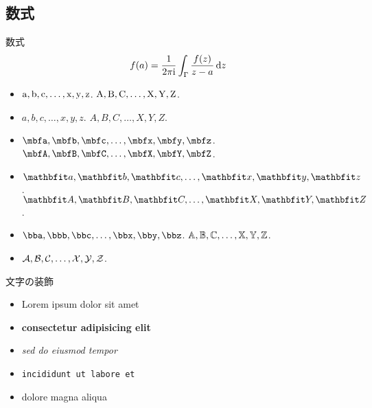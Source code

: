 \documentclass[unicode]{beamer}
\begin{document}
  \subsection{数式}
  \begin{frame}{数式}
    \begin{align}
      f(a) = \frac{1}{2\pi\mathrm{i}} \int_\Gamma \frac{f(z)}{z-a} \dd{z}
    \end{align}
    \begin{itemize}
      \item $\mathrm{a},\mathrm{b},\mathrm{c},\dots,\mathrm{x},\mathrm{y},\mathrm{z}$. $\mathrm{A},\mathrm{B},\mathrm{C},\dots,\mathrm{X},\mathrm{Y},\mathrm{Z}$.
      \item $a,b,c,\dots,x,y,z$. $A,B,C,\dots,X,Y,Z$.
      \item $\bfa,\bfb,\bfc,\dots,\bfx,\bfy,\bfz$. $\bfA,\bfB,\bfC,\dots,\bfX,\bfY,\bfZ$.
      \item $\bma,\bmb,\bmc,\dots,\bmx,\bmy,\bmz$. $\bmA,\bmB,\bmC,\dots,\bmX,\bmY,\bmZ$.
      \item $\bba,\bbb,\bbc,\dots,\bbx,\bby,\bbz$. $\mathbb{A},\mathbb{B},\mathbb{C},\dots,\mathbb{X},\mathbb{Y},\mathbb{Z}$.
      \item $\mathcal{A},\mathcal{B},\mathcal{C},\dots,\mathcal{X},\mathcal{Y},\mathcal{Z}$.
    \end{itemize}
  \end{frame}

  \begin{frame}{文字の装飾}
    \begin{itemize}
      \item Lorem ipsum dolor sit amet
      \item \textbf{consectetur adipisicing elit}
      \item \textit{sed do eiusmod tempor}
      \item \texttt{incididunt ut labore et}
      \item \alert{dolore magna aliqua}
    \end{itemize}
  \end{frame}
\end{document}
